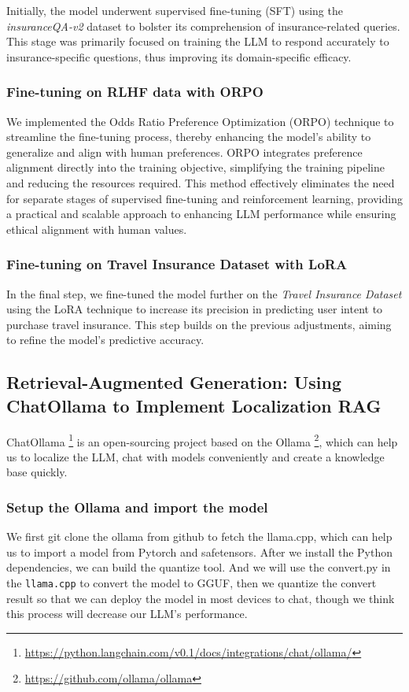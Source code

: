 \documentclass[conference]{IEEEtran}
\begin{document}
Initially, the model underwent supervised fine-tuning (SFT) using the \textit{insuranceQA-v2} dataset to bolster its comprehension of insurance-related queries. This stage was primarily focused on training the LLM to respond accurately to insurance-specific questions, thus improving its domain-specific efficacy.

\subsubsection{Fine-tuning on RLHF data with ORPO}

We implemented the Odds Ratio Preference Optimization (ORPO) \cite{hong2024orpo} technique to streamline the fine-tuning process, thereby enhancing the model's ability to generalize and align with human preferences. ORPO integrates preference alignment directly into the training objective, simplifying the training pipeline and reducing the resources required. This method effectively eliminates the need for separate stages of supervised fine-tuning and reinforcement learning, providing a practical and scalable approach to enhancing LLM performance while ensuring ethical alignment with human values.

\subsubsection{Fine-tuning on Travel Insurance Dataset with LoRA}

In the final step, we fine-tuned the model further on the \textit{Travel Insurance Dataset} using the LoRA technique to increase its precision in predicting user intent to purchase travel insurance. This step builds on the previous adjustments, aiming to refine the model's predictive accuracy.


\subsection{Retrieval-Augmented Generation: Using ChatOllama to Implement Localization RAG}

ChatOllama \footnote{\url{https://python.langchain.com/v0.1/docs/integrations/chat/ollama/}} is an open-sourcing project based on the Ollama \footnote{\url{https://github.com/ollama/ollama}}, which can help us to localize the LLM, chat with models conveniently and create a knowledge base quickly.

\subsubsection{Setup the Ollama and import the model}
We first git clone the ollama from github to fetch the llama.cpp, which can help us to import a model from Pytorch and safetensors. After we install the Python dependencies, we can build the quantize tool. And we will use the convert.py in the \verb|llama.cpp| to convert the model to GGUF, then we quantize the convert result so that we can deploy the model in most devices to chat, though we think this process will decrease our LLM's performance. 
\end{document}
